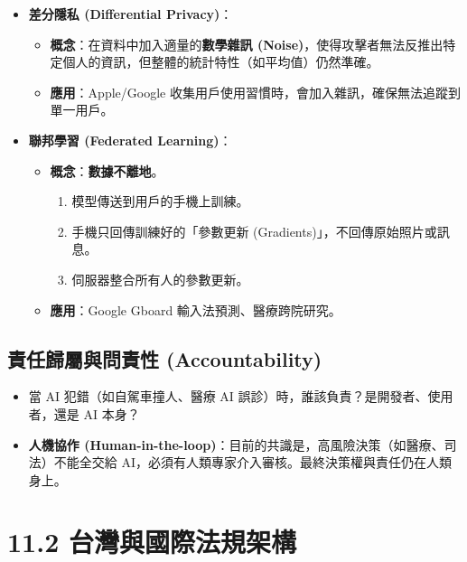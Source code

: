 \documentclass[
  letterpaper,
  DIV=11,
  numbers=noendperiod]{scrreprt}
\providecommand{\tightlist}{%
  \setlength{\itemsep}{0pt}\setlength{\parskip}{0pt}}
\begin{document}
\begin{itemize}
\tightlist
\item
  \textbf{差分隱私 (Differential Privacy)}：

  \begin{itemize}
  \tightlist
  \item
    \textbf{概念}：在資料中加入適量的\textbf{數學雜訊
    (Noise)}，使得攻擊者無法反推出特定個人的資訊，但整體的統計特性（如平均值）仍然準確。
  \item
    \textbf{應用}：Apple/Google
    收集用戶使用習慣時，會加入雜訊，確保無法追蹤到單一用戶。
  \end{itemize}
\item
  \textbf{聯邦學習 (Federated Learning)}：

  \begin{itemize}
  \tightlist
  \item
    \textbf{概念}：\textbf{數據不離地}。

    \begin{enumerate}
    \def\labelenumi{\arabic{enumi}.}
    \tightlist
    \item
      模型傳送到用戶的手機上訓練。
    \item
      手機只回傳訓練好的「參數更新 (Gradients)」，不回傳原始照片或訊息。
    \item
      伺服器整合所有人的參數更新。
    \end{enumerate}
  \item
    \textbf{應用}：Google Gboard 輸入法預測、醫療跨院研究。
  \end{itemize}
\end{itemize}

\section{責任歸屬與問責性 (Accountability)}\label{sec-accountability}

\begin{itemize}
\tightlist
\item
  當 AI 犯錯（如自駕車撞人、醫療 AI
  誤診）時，誰該負責？是開發者、使用者，還是 AI 本身？
\item
  \textbf{人機協作
  (Human-in-the-loop)}：目前的共識是，高風險決策（如醫療、司法）不能全交給
  AI，必須有人類專家介入審核。最終決策權與責任仍在人類身上。
\end{itemize}

\chapter{11.2 台灣與國際法規架構}\label{sec-regulations}
\end{document}
